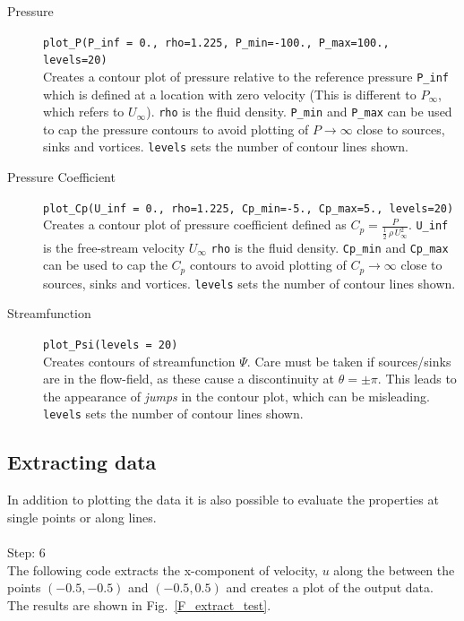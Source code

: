 \documentclass[10pt,a4paper]{article}
\begin{document}
\begin{description}
\item[Pressure] \verb'plot_P(P_inf = 0., rho=1.225, P_min=-100., P_max=100., levels=20)'\\
Creates a contour plot of pressure relative to the reference pressure \verb'P_inf' which is defined at a location with zero velocity (This is different to $P_{\infty}$, which refers to $U_{\infty}$). 
\verb'rho' is the fluid density. 
\verb'P_min' and \verb'P_max' can be used to cap the pressure contours to avoid plotting of $P\rightarrow \infty$ close to sources, sinks and vortices.  
\verb'levels' sets the number of contour lines shown.

\item[Pressure Coefficient] \verb'plot_Cp(U_inf = 0., rho=1.225, Cp_min=-5., Cp_max=5., levels=20)'\\
Creates a contour plot of pressure coefficient defined as $C_p = \frac{P}{\frac{1}{2} \, \rho \, U_{\infty}^2}$. 
\verb'U_inf' is the free-stream velocity $U_\infty$ 
\verb'rho' is the fluid density. 
\verb'Cp_min' and \verb'Cp_max' can be used to cap the $C_p$ contours to avoid plotting of $C_p \rightarrow \infty$ close to sources, sinks and vortices.  
\verb'levels' sets the number of contour lines shown.

\item[Streamfunction] \verb'plot_Psi(levels = 20)' \\
Creates contours of streamfunction $\Psi$. 
Care must be taken if sources/sinks are in the flow-field, as these cause a discontinuity at $\theta = \pm \pi$. 
This leads to the appearance of {\it jumps} in the contour plot, which can be misleading. 
\verb'levels' sets the number of contour lines shown.


\end{description}


\subsection{Extracting data}
In addition to plotting the data it is also possible to evaluate the properties at single points or along lines. 
\\ \\
\noindent
{\huge Step: 6}\\
The following code extracts the x-component of velocity, $u$ along the between the points $(-0.5, -0.5)$ and $(-0.5, 0.5)$ and creates a plot of the output data. 
The results are shown in Fig.~\ref{F_extract_test}.
\end{document}
